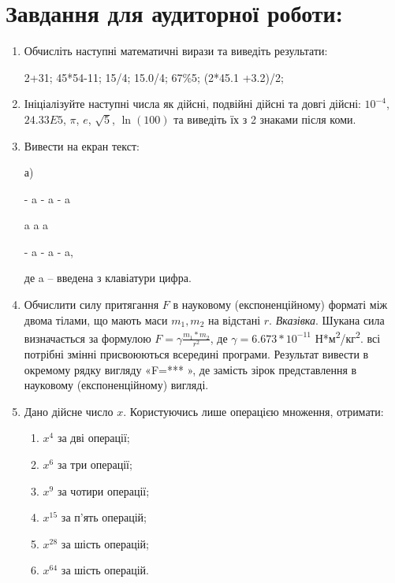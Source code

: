 \documentclass[a5paper,titlepage,openany,twoside,
]
{book_unv}%
\makeatletter
\newcommand{\xslalph}[1]{\expandafter\@xslalph\csname c@#1\endcsname}
\newcommand{\@xslalph}[1]{%
    \ifcase#1\or а\or б\or в\or г\or д\or e\or є\or ж\or з\or i%
    \or й\or к\or л\or м\or н\or о\or п\or р\or с\or т%
    \or у\or ф\or х\or ц\or ч\or ш\or ю\or я\or аа\or бб\or вв%
    \else\@ctrerr\fi%
}
\makeatother
\begin{document}
\section{Завдання для аудиторної роботи:}

\begin{enumerate}
\def\labelenumi{\arabic{enumi}.}
\item
Обчисліть наступні математичні вирази та виведіть результати:

2+31; 45*54-11; 15/4; 15.0/4; 67\%5; (2*45.1 +3.2)/2;

\item
Ініціалізуйте наступні числа як дійсні, подвійні дійсні та довгі
дійсні: $10^{-4}$, $24.33E5$, $\pi$, $e$, $\sqrt{5}$,
$\ln(100)$ та виведіть їх з 2 знаками після коми.

\item
Вивести на екран текст:

а)

-\/ a -\/ a -\/ a

a \textbar{} a \textbar{} a

-\/ a -\/ a -\/ a,

де a -- введена з клавіатури цифра.

\item
Обчислити силу притягання $F$ в науковому (експоненційному) форматі між двома тілами,
що мають маси $m_{1},m_{2}$ на відстані $r$.
\emph{\emph{Вказівка}}. Шукана сила визначається за формулою
$ F=\gamma \frac{m_{1}*m_{2}}{r^{2}}$,
де $\gamma = 6.673*10^{-11}$ Н*м\textsuperscript{2}/кг\textsuperscript{2}. всі потрібні змінні
присвоюються всередині програми. Результат вивести в окремому рядку
вигляду «F=*** », де замість зірок представлення в науковому
(експоненційному) вигляді.

\item
Дано дійсне число \(x\). Користуючись лише операцією множення,
отримати:
\begin{multicols}{2}
\begin{enumerate}[label=\xslalph*)]
\item \(x^{4}\) за дві операції;
\item \(x^{6}\) за три операції;
\item \(x^{9}\) за чотири операції;
\item \(x^{15}\) за п'ять операцій;
\item \(x^{28}\) за шість операцій;
\item \(x^{64}\) за шість операцій.
\end{enumerate}
\end{multicols}


\end{enumerate}
\end{document}
